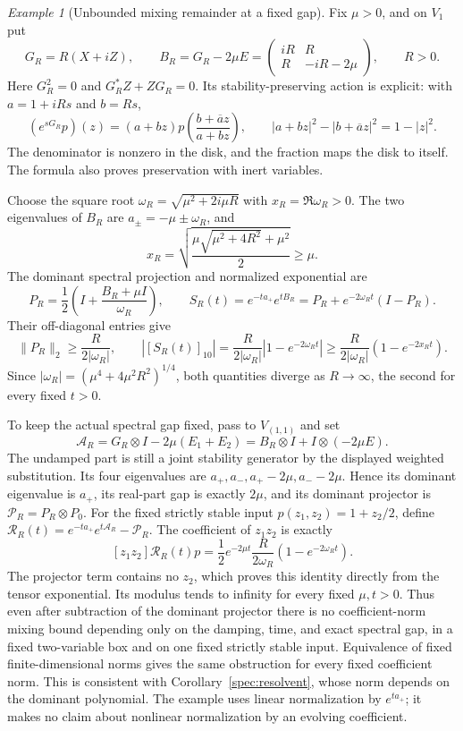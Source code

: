 \documentclass[reqno]{amsart}
\theoremstyle{definition}
\theoremstyle{remark}
\newtheorem{example}[theorem]{Example}
\newcommand{\R}{\mathbb R}
\begin{document}
\begin{example}[Unbounded mixing remainder at a fixed gap]\label{spec:nonnormal}
Fix \(\mu>0\), and on \(V_1\) put
\[
 G_R=R(X+iZ),\qquad
 B_R=G_R-2\mu E=
 \begin{pmatrix}iR&R\\R&-iR-2\mu\end{pmatrix},\qquad R>0.
\]
Here \(G_R^2=0\) and \(G_R^*Z+ZG_R=0\).  Its stability-preserving
action is explicit: with \(a=1+iRs\) and \(b=Rs\),
\[
 (e^{sG_R}p)(z)=(a+bz)
 p\!\left(\frac{b+\overline a z}{a+bz}\right),\qquad
 |a+bz|^2-|b+\overline a z|^2=1-|z|^2.
\]
The denominator is nonzero in the disk, and the fraction maps the
disk to itself.  The formula also proves preservation with inert
variables.

Choose the square root \(\omega_R=\sqrt{\mu^2+2i\mu R}\) with
\(x_R=\Re\omega_R>0\).  The two eigenvalues of \(B_R\) are
\(a_\pm=-\mu\pm\omega_R\), and
\[
 x_R=\sqrt{\frac{\mu\sqrt{\mu^2+4R^2}+\mu^2}{2}}\ge\mu.
\]
The dominant spectral projection and normalized exponential are
\[
 P_R=\frac12\left(I+\frac{B_R+\mu I}{\omega_R}\right),\qquad
 S_R(t)=e^{-ta_+}e^{tB_R}
       =P_R+e^{-2\omega_Rt}(I-P_R).
\]
Their off-diagonal entries give
\[
 \|P_R\|_2\ge\frac{R}{2|\omega_R|},\qquad
 |[S_R(t)]_{10}|
 =\frac{R}{2|\omega_R|}|1-e^{-2\omega_Rt}|
 \ge\frac{R}{2|\omega_R|}(1-e^{-2x_Rt}).
\]
Since \(|\omega_R|=(\mu^4+4\mu^2R^2)^{1/4}\), both quantities
diverge as \(R\to\infty\), the second for every fixed \(t>0\).

To keep the actual spectral gap fixed, pass to \(V_{(1,1)}\) and set
\[
 \mathcal A_R=G_R\otimes I-2\mu(E_1+E_2)
             =B_R\otimes I+I\otimes(-2\mu E).
\]
The undamped part is still a joint stability generator by the displayed
weighted substitution.  Its four eigenvalues are
\(a_+,a_-,a_+-2\mu,a_--2\mu\).  Hence its dominant eigenvalue
is \(a_+\), its real-part gap is exactly \(2\mu\), and its
dominant projector is \(\mathcal P_R=P_R\otimes P_0\).
For the fixed strictly stable input \(p(z_1,z_2)=1+z_2/2\), define
\(\mathcal R_R(t)=e^{-ta_+}e^{t\mathcal A_R}-\mathcal P_R\).
The coefficient of \(z_1z_2\) is exactly
\[
 [z_1z_2]\mathcal R_R(t)p
 =\frac12e^{-2\mu t}\frac{R}{2\omega_R}
   (1-e^{-2\omega_Rt}).
\]
The projector term contains no \(z_2\), which proves this identity
directly from the tensor exponential.  Its modulus tends to infinity
for every fixed \(\mu,t>0\).  Thus even after subtraction of the
dominant projector there is no coefficient-norm mixing bound depending
only on the damping, time, and exact spectral gap, in a fixed two-variable
box and on one fixed strictly stable input.  Equivalence of fixed
finite-dimensional norms gives the same obstruction for every fixed
coefficient norm.  This is consistent with Corollary~\ref{spec:resolvent},
whose norm depends on the dominant polynomial.  The example uses linear
normalization by \(e^{ta_+}\); it makes no claim about nonlinear
normalization by an evolving coefficient.
\end{example}
\end{document}
